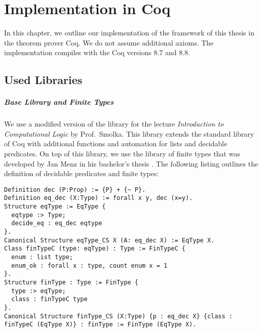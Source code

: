 \chapter{Implementation in Coq}
\label{chap:implementation}

\lstset{style=coq}





In this chapter, we outline our implementation of the framework of this thesis in the theorem prover Coq.  We do not assume
additional axioms.  The implementation compiles with the Coq versions 8.7 and 8.8.

\section{Used Libraries}
\label{sec:coq-libraries}

\paragraph{Base Library and Finite Types}

We use a modified version of the library for the lecture \textit{Introduction to Computational Logic} by Prof.\ Smolka.  This library extends the
standard library of Coq with additional functions and automation for lists and decidable predicates.  On top of this library, we use the library of
finite types that was developed by Jan Menz in his bachelor's thesis \cite{JanMenz}.  The following listing outlines the definition of decidable
predicates and finite types:

\begin{lstlisting}
Definition dec (P:Prop) := {P} + {~ P}.
Definition eq_dec (X:Type) := forall x y, dec (x=y).
Structure eqType := EqType {
  eqtype :> Type;
  decide_eq : eq_dec eqtype
}.
Canonical Structure eqType_CS X (A: eq_dec X) := EqType X.
Class finTypeC (type: eqType) : Type := FinTypeC {
  enum : list type;
  enum_ok : forall x : type, count enum x = 1
}.
Structure finType : Type := FinType {
  type :> eqType;
  class : finTypeC type
}.
Canonical Structure finType_CS (X:Type) {p : eq_dec X} {class : finTypeC (EqType X)} : finType := FinType (EqType X).
\end{lstlisting}%

